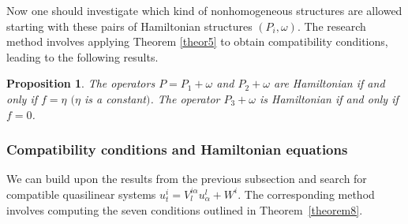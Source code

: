 \documentclass[10pt,a4paper]{amsart}
\numberwithin{equation}{section}
\newtheorem{Proposition}[Theorem]{Proposition}
 { \theoremstyle{definition}
\newtheorem{Definition}[Theorem]{Definition}
\newtheorem{Note}[Theorem]{Note}
\newtheorem{Example}[Theorem]{Example}
\newtheorem{Remark}[Theorem]{Remark} }
\begin{document}
Now one should investigate which kind of nonhomogeneous structures are allowed starting with these pairs of Hamiltonian structures $(P_i,\omega)$. The research method involves applying Theorem \ref{theor5} to obtain compatibility conditions, leading to the following results.
\begin{Proposition}
The operators $P=P_1+\omega$ and $P_2+\omega$ are Hamiltonian if and only if $f=\eta$ $(\eta$ is a constant$)$. The operator $P_3+\omega$ is Hamiltonian if and only if $f=0$.
\end{Proposition}

\subsubsection{Compatibility conditions and Hamiltonian equations}\label{sec:res}
We can build upon the results from the previous subsection and search for compatible quasilinear systems $u^i_t=V^{i\alpha}_lu^l_\alpha+W^i$. The corresponding method involves computing the seven conditions outlined in Theorem~\ref{theorem8}.
\end{document}
